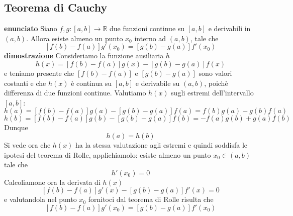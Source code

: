 \documentclass[a4paper, 9pt]{report}
\begin{document}
\subsection*{Teorema di Cauchy}
\textbf{enunciato}\newline
Siano $f,g : [a,b] \rightarrow \mathbb{R}$ due funzioni continue su $[a,b]$ e derivabili in $(a,b)$. Allora esiste almeno un punto $x_0$ interno ad $(a,b)$, tale che 
\[
    [f(b) -f(a)] g'(x_0) = [g(b) -g(a)] f'(x_0)
\]
\textbf{dimostrazione}\newline
Consideriamo la funzione ausiliaria $h$
\[
    h(x) = [f(b) -f(a)]g(x) - [g(b) - g(a)]f(x)
\]
e teniamo presente che $[f(b) - f(a)]$ e $[g(b) - g(a)]$ sono valori costanti e che $h(x)$ è continua su $[a,b]$ e derivabile su $(a,b)$, poichè differenza di due funzioni continue.\newline
Valutiamo $h(x)$  sugli estremi dell'intervallo $[a,b]$:
\[
    h(a) = [f(b)- f(a)]g(a) - [g(b)- g(a)] f(a) = f(b)g(a) - g(b)f(a) 
\]
\[
    h(b) = [f(b) - f(a)]g(b)- [g(b)- g(a)]f(b) = -f(a) g(b) + g(a)f(b)
\]
Dunque
\[
    h(a) = h(b)
\]
Si vede ora che $h(x)$ ha la stessa valutazione agli estremi e quindi soddisfa le ipotesi del teorema di Rolle, applichiamolo: esiste almeno un punto $x_0 \in (a,b)$ tale che 
\[
    h'(x_0) = 0
\]
Calcoliamone ora la derivata di $h(x)$
\[
    [f(b) - f(a)]g'(x) - [g(b) - g(a)]f'(x) = 0
\]
e valutandola nel punto $x_0$ fornitoci dal teorema di Rolle risulta che
\[
    [f(b)- f(a)]g'(x_0) = [g(b) - g(a)]f'(x_0)
\]






\newpage
\end{document}
